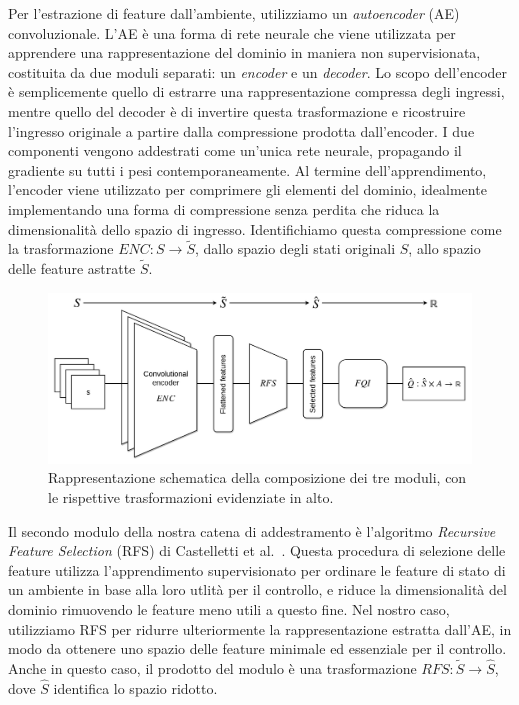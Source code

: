 Per l'estrazione di feature dall'ambiente, utilizziamo un \textit{autoencoder} 
(AE) convoluzionale.
L'AE \`e una forma di rete neurale che viene utilizzata per apprendere una 
rappresentazione del dominio in maniera non supervisionata, costituita da due 
moduli separati: un \textit{encoder} e un \textit{decoder}.
Lo scopo dell'encoder \`e semplicemente quello di estrarre una rappresentazione
compressa degli ingressi, mentre quello del decoder \`e di invertire questa
trasformazione e ricostruire l'ingresso originale a partire dalla compressione 
prodotta dall'encoder. 
I due componenti vengono addestrati come un'unica rete neurale, propagando il 
gradiente su tutti i pesi contemporaneamente. 
Al termine dell'apprendimento, l'encoder viene utilizzato per comprimere gli 
elementi del dominio, idealmente implementando una forma di compressione senza 
perdita che riduca la dimensionalit\`a dello spazio di ingresso. 
Identifichiamo questa compressione come la trasformazione $ENC: S \rightarrow \tilde{S}$, 
dallo spazio degli stati originali $S$, allo spazio delle feature astratte $\tilde{S}$.
%
\begin{figure}
\includegraphics[width=\textwidth]{pictures/full_pipeline}
\centering
\caption[Rappresentazione dei tre moduli principali]{Rappresentazione
						     schematica della composizione dei tre moduli, con le rispettive
						     trasformazioni evidenziate in alto.}
\label{f:abs_full}
\end{figure}
%

Il secondo modulo della nostra catena di addestramento \`e l'algoritmo 
\textit{Recursive Feature Selection} (RFS) di Castelletti et al.\ \cite{castelletti2011tree}.
Questa procedura di selezione delle feature utilizza l'apprendimento supervisionato
per ordinare le feature di stato di un ambiente in base alla loro utlit\`a per 
il controllo, e riduce la dimensionalit\`a del dominio rimuovendo le feature 
meno utili a questo fine. 
Nel nostro caso, utilizziamo RFS per ridurre ulteriormente la rappresentazione 
estratta dall'AE, in modo da ottenere uno spazio delle feature minimale ed 
essenziale per il controllo. 
Anche in questo caso, il prodotto del modulo \`e una trasformazione 
$RFS: \tilde{S} \rightarrow \hat{S}$, dove $\hat{S}$ identifica lo spazio 
ridotto. 

